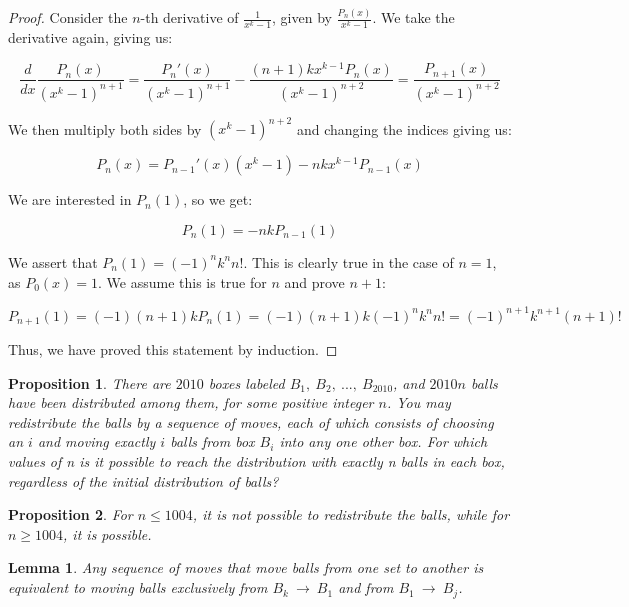 \documentclass[10pt, oneside]{article}
\newtheorem{lem}{Lemma}
\newtheorem{prop}{Proposition}
\begin{document}
    \begin{proof}
      Consider the $n$-th derivative of $\frac{1}{x^k - 1}$, given by $\frac{P_n(x)}{x^k - 1}$. We take the derivative again, giving us:

      $$\frac{d}{dx} \frac{P_n(x)}{(x^k - 1)^{n + 1}} = \frac{P_n'(x)}{(x^k - 1)^{n + 1}} - \frac{(n + 1) kx^{k - 1} P_n(x)}{(x^k - 1)^{n + 2}} = \frac{P_{n + 1}(x)}{(x^k - 1)^{n + 2}}$$

      We then multiply both sides by $(x^k - 1)^{n + 2}$ and changing the indices giving us:

      $$P_{n}(x) = P_{n - 1}'(x) (x^k - 1) - n kx^{k - 1} P_{n - 1}(x)$$

      We are interested in $P_n(1)$, so we get:

      $$P_n(1) = -nk P_{n - 1}(1)$$

      We assert that $P_n(1) = (-1)^n k^n n!$. This is clearly true in the case of $n = 1$, as $P_0(x) = 1$. We assume this is true for $n$ and prove $n + 1$:

      $$P_{n + 1}(1) = (-1) (n + 1) k P_n(1) = (-1) (n + 1)k (-1)^n k^n n! = (-1)^{n + 1} k^{n + 1} (n + 1)!$$

      Thus, we have proved this statement by induction.
    \end{proof}

    \begin{prop}
      There are $2010$ boxes labeled $B_{1}, \ B_{2}, \ . . . , \ B_{2010}$, and $2010n$ balls have been
      distributed among them, for some positive integer $n$. You may redistribute the balls
      by a sequence of moves, each of which consists of choosing an $i$ and moving exactly $i$
      balls from box $B_i$
      into any one other box. For which values of n is it possible to reach
      the distribution with exactly n balls in each box, regardless of the initial distribution
      of balls?
    \end{prop}

    \begin{prop}
      For $n \leq 1004$, it is not possible to redistribute the balls, while for $n \geq 1004$, it is possible.
    \end{prop}

    \begin{lem}
      Any sequence of moves that move balls from one set to another is equivalent to moving balls exclusively from $B_k \ \rightarrow \ B_1$ and from
      $B_1 \ \rightarrow \ B_j$.
    \end{lem}
\end{document}

